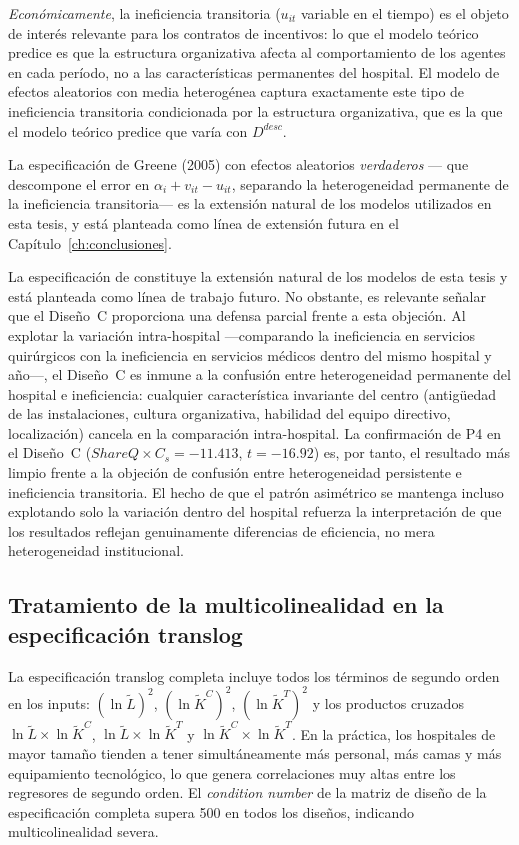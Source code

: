 \documentclass[12pt, a4paper, twoside, openright]{book}
\theoremstyle{plain}
\theoremstyle{definition}
\theoremstyle{remark}
\begin{document}
\textit{Económicamente}, la ineficiencia transitoria ($u_{it}$ variable en el tiempo) es el objeto de interés relevante para los contratos de incentivos: lo que el modelo teórico predice es que la estructura organizativa afecta al comportamiento de los agentes en cada período, no a las características permanentes del hospital. El modelo de efectos aleatorios con media heterogénea \citep{battese1995,wang2002} captura exactamente este tipo de ineficiencia transitoria condicionada por la estructura organizativa, que es la que el modelo teórico predice que varía con $D^{desc}$.

La especificación de Greene (2005) con efectos aleatorios \textit{verdaderos} --- que descompone el error en $\alpha_i + v_{it} - u_{it}$, separando la heterogeneidad permanente de la ineficiencia transitoria--- es la extensión natural de los modelos utilizados en esta tesis, y está planteada como línea de extensión futura en el Capítulo~\ref{ch:conclusiones}.

La especificación de \citet{greene2005a} constituye la extensión natural de los modelos de esta tesis y está planteada como línea de trabajo futuro. No obstante, es relevante señalar que el Diseño~C proporciona una defensa parcial frente a esta objeción. Al explotar la variación intra-hospital ---comparando la ineficiencia en servicios quirúrgicos con la ineficiencia en servicios médicos dentro del mismo hospital y año---, el Diseño~C es inmune a la confusión entre heterogeneidad permanente del hospital e ineficiencia: cualquier característica invariante del centro (antigüedad de las instalaciones, cultura organizativa, habilidad del equipo directivo, localización) cancela en la comparación intra-hospital. La confirmación de P4 en el Diseño~C ($ShareQ \times C_s = -11.413$, $t = -16.92$) es, por tanto, el resultado más limpio frente a la objeción de confusión entre heterogeneidad persistente e ineficiencia transitoria. El hecho de que el patrón asimétrico se mantenga incluso explotando solo la variación dentro del hospital refuerza la interpretación de que los resultados reflejan genuinamente diferencias de eficiencia, no mera heterogeneidad institucional.

\subsection{Tratamiento de la multicolinealidad en la especificación translog}

La especificación translog completa incluye todos los términos de segundo orden en los inputs: $(\ln\tilde{L})^2$, $(\ln\tilde{K}^C)^2$, $(\ln\tilde{K}^T)^2$ y los productos cruzados $\ln\tilde{L}\times\ln\tilde{K}^C$, $\ln\tilde{L}\times\ln\tilde{K}^T$ y $\ln\tilde{K}^C\times\ln\tilde{K}^T$. En la práctica, los hospitales de mayor tamaño tienden a tener simultáneamente más personal, más camas y más equipamiento tecnológico, lo que genera correlaciones muy altas entre los regresores de segundo orden. El \textit{condition number} de la matriz de diseño de la especificación completa supera 500 en todos los diseños, indicando multicolinealidad severa.
\end{document}
